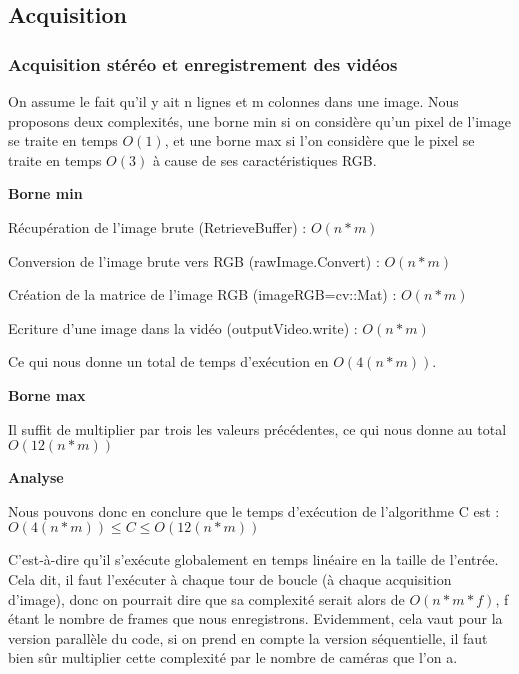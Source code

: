 \subsection{Acquisition}

\subsubsection{Acquisition stéréo et enregistrement des vidéos}

On assume le fait qu'il y ait n lignes et m colonnes dans une image. Nous proposons deux complexités, une borne min si on considère qu'un pixel de l'image se traite en temps $O(1)$, et une borne max si l'on considère que le pixel se traite en temps $O(3)$ à cause de ses caractéristiques RGB.

\textbf{Borne min}

Récupération de l'image brute (RetrieveBuffer) : $O(n*m)$

Conversion de l'image brute vers RGB (rawImage.Convert) : $O(n*m)$

Création de la matrice de l'image RGB (imageRGB=cv::Mat) : $O(n*m)$

Ecriture d'une image dans la vidéo (outputVideo.write) : $O(n*m)$

Ce qui nous donne un total de temps d'exécution en $O(4(n*m))$.

\textbf{Borne max}

Il suffit de multiplier par trois les valeurs précédentes, ce qui nous donne au total $O(12(n*m))$

\textbf{Analyse}

Nous pouvons donc en conclure que le temps d'exécution de l'algorithme C est :
$O(4(n*m)) \leq C \leq O(12(n*m))$

C'est-à-dire qu'il s'exécute globalement en temps linéaire en la taille de l'entrée. Cela dit, il faut l'exécuter à chaque tour de boucle (à chaque acquisition d'image), donc on pourrait dire que sa complexité serait alors de $O(n*m*f)$, f étant le nombre de frames que nous enregistrons. Evidemment, cela vaut pour la version parallèle du code, si on prend en compte la version séquentielle, il faut bien sûr multiplier cette complexité par le nombre de caméras que l'on a.